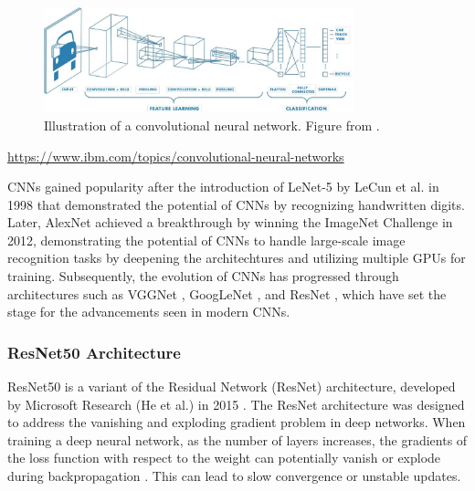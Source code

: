 \begin{figure}[ht]
    \centering
    \includegraphics[width=0.8\textwidth]{Images/CNN_illustration.jpg} 
    \caption{Illustration of a convolutional neural network. Figure from \cite{mathworks_cnn}. }
    \label{fig:cnn_illustration}
\end{figure}

\url{https://www.ibm.com/topics/convolutional-neural-networks}

CNNs gained popularity after the introduction of LeNet-5 by LeCun et al. in 1998 \cite{lecun1998} that demonstrated the potential of CNNs by recognizing handwritten digits. Later, AlexNet \cite{NIPS2012_c399862d} achieved a breakthrough by winning the ImageNet Challenge in 2012, demonstrating the potential of CNNs to handle large-scale image recognition tasks by deepening the architechtures and utilizing multiple GPUs for training. Subsequently, the evolution of CNNs has progressed through architectures such as VGGNet \cite{simonyan2015deepconvolutionalnetworkslargescale}, GoogLeNet \cite{szegedy2014goingdeeperconvolutions}, and ResNet \cite{he2015deepresiduallearningimage}, which have set the stage for the advancements seen in modern CNNs.


\subsubsection{ResNet50 Architecture}
\label{sec:resnet}
ResNet50 is a variant of the Residual Network (ResNet) architecture, developed by Microsoft Research (He et al.) in 2015 \cite{he2015deepresiduallearningimage}. The ResNet architecture was designed to address the vanishing and exploding gradient problem in deep networks. When training a deep neural network, as the number of layers increases, the gradients of the loss function with respect to the weight can potentially vanish or explode during backpropagation \cite{he2015deepresiduallearningimage}. This can lead to slow convergence or unstable updates.

